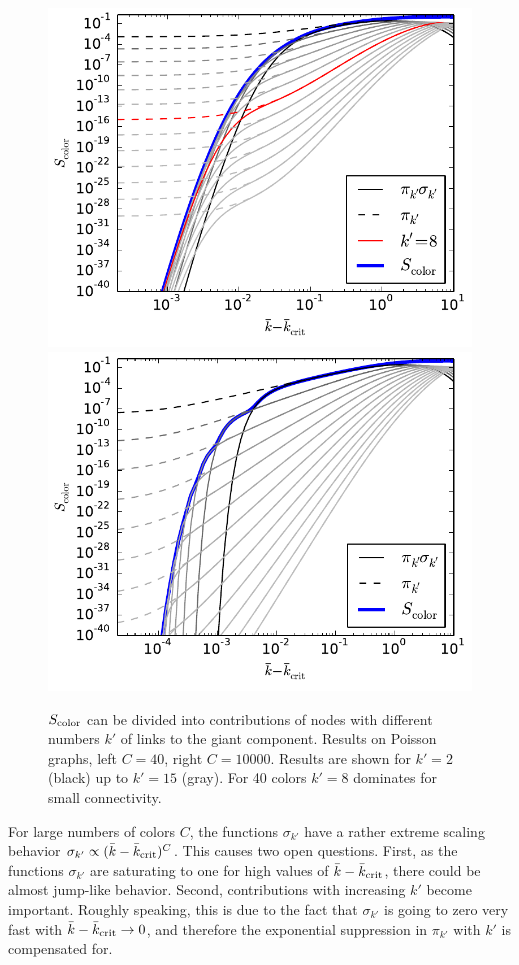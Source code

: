 \documentclass[aps, pre, onecolumn, a4paper, floatfix]{revtex4}
\begin{document}
\begin{figure}[htb]
    \includegraphics[width=0.49\columnwidth]{cross_over_C40.pdf}
    \includegraphics[width=0.49\columnwidth]{cross_over_C10000.pdf}\\
    \caption{$S_{\rm color}$ can be divided into contributions of nodes with different numbers 
    $k'$ of links to the giant component. Results on Poisson graphs, left $C=40$, right $C=10000$. 
    Results are shown for $k'=2$ (black) up to $k'=15$ (gray). 
    For 40 colors $k'=8$ dominates for small connectivity.}
    \label{fig:1}
\end{figure}
%
For large numbers of colors $C$, the functions $\sigma_{k'}$ have a rather extreme scaling 
behavior $\sigma_{k'} \propto (\bar{k}-{\bar k}_{\rm crit})^C$. This causes two open 
questions. First, as the functions $\sigma_{k'}$ are saturating to one for high 
values of $\bar{k}-{\bar k}_{\rm crit}$, there could be almost jump-like behavior. 
Second, contributions with increasing $k'$ become important. Roughly speaking, this is due 
to the fact that $\sigma_{k'}$ is going to zero very fast with $\bar{k}-{\bar k}_{\rm crit}\to 0$, 
and therefore the exponential suppression in $\pi_{k'}$ with $k'$ is compensated for. 
\end{document}
